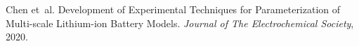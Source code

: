 
\begin{DoxyDescription}
\item[\label{citelist_CITEREF_Chen2020}%
\Hypertarget{citelist_CITEREF_Chen2020}%
\mbox{[}1\mbox{]}]Chen et~al. Development of Experimental Techniques for Parameterization of Multi-\/scale Lithium-\/ion Battery Models. {\itshape Journal of The Electrochemical Society}, 2020.


\end{DoxyDescription}